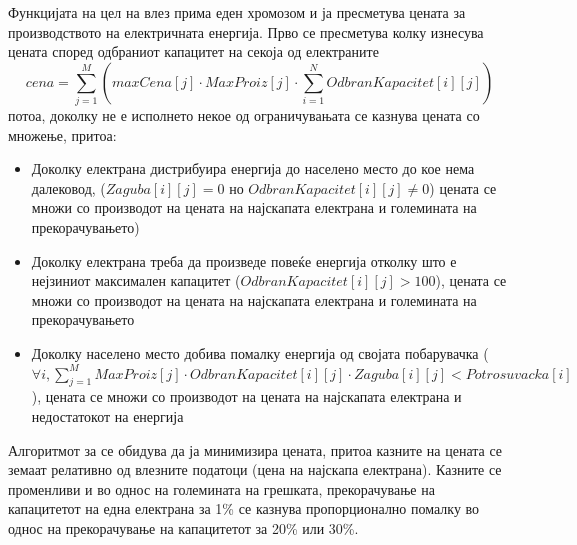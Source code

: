 \documentclass{article}
\begin{document}
Функцијата на цел на влез прима еден хромозом и ја пресметува цената за производството на електричната енергија. Прво се пресметува колку изнесува цената според одбраниот капацитет на секоја од електраните 
\[ cena = \sum_{j=1}^{M} (maxCena[j] \cdot MaxProiz[j] \cdot  \sum_{i=1}^{N} OdbranKapacitet[i][j] )\]
потоа, доколку не е исполнето некое од ограничувањата се казнува цената со множење, притоа:
\begin{itemize}
\item Доколку електрана дистрибуира енергија до населено место до кое нема далековод, ($Zaguba[i][j] = 0$ но $OdbranKapacitet[i][j] \neq 0$) цената се множи со производот на цената на најскапата електрана и големината на прекорачувањето)  
\item Доколку електрана треба да произведе повеќе енергија отколку што е нејзиниот максимален капацитет ($OdbranKapacitet[i][j] > 100$), цената се множи со производот на цената на најскапата електрана и големината на прекорачувањето 
\item Доколку населено место добива помалку енергија од својата побарувачка ($ \forall i, \sum_{j=1}^{M} MaxProiz[j] \cdot OdbranKapacitet[i][j] \cdot Zaguba[i][j] < Potrosuvacka[i]$), цената се множи со производот на цената на најскапата електрана и недостатокот на енергија 
\end{itemize}

Алгоритмот за се обидува да ја минимизира цената, притоа казните на цената се земаат релативно од влезните податоци (цена на најскапа електрана). Казните се променливи и во однос на големината на грешката, прекорачување на капацитетот на една електрана за 1\% се казнува пропорционално помалку во однос на прекорачување на капацитетот за 20\% или 30\%.
\end{document}

